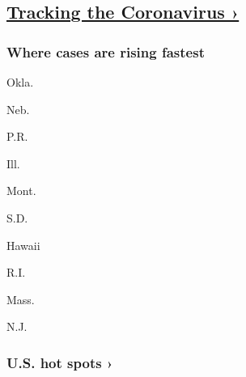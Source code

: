 \hypertarget{tracking-the-coronavirus-}{%
\subsection{\texorpdfstring{\href{https://www.nytimes3xbfgragh.onion/interactive/2020/us/coronavirus-us-cases.html}{Tracking
the Coronavirus
›}}{Tracking the Coronavirus ›}}\label{tracking-the-coronavirus-}}

\href{https://www.nytimes3xbfgragh.onion/interactive/2020/us/coronavirus-us-cases.html}{}

\hypertarget{where-cases-are-rising-fastest}{%
\subsubsection{\texorpdfstring{Where cases are \textbf{rising}
fastest}{Where cases are rising fastest}}\label{where-cases-are-rising-fastest}}

\href{https://www.nytimes3xbfgragh.onion/interactive/2020/us/oklahoma-coronavirus-cases.html}{}

Okla.
\href{https://www.nytimes3xbfgragh.onion/interactive/2020/us/nebraska-coronavirus-cases.html}{}

Neb.
\href{https://www.nytimes3xbfgragh.onion/interactive/2020/us/puerto-rico-coronavirus-cases.html}{}

P.R.
\href{https://www.nytimes3xbfgragh.onion/interactive/2020/us/illinois-coronavirus-cases.html}{}

Ill.
\href{https://www.nytimes3xbfgragh.onion/interactive/2020/us/montana-coronavirus-cases.html}{}

Mont.
\href{https://www.nytimes3xbfgragh.onion/interactive/2020/us/south-dakota-coronavirus-cases.html}{}

S.D.
\href{https://www.nytimes3xbfgragh.onion/interactive/2020/us/hawaii-coronavirus-cases.html}{}

Hawaii
\href{https://www.nytimes3xbfgragh.onion/interactive/2020/us/rhode-island-coronavirus-cases.html}{}

R.I.
\href{https://www.nytimes3xbfgragh.onion/interactive/2020/us/massachusetts-coronavirus-cases.html}{}

Mass.
\href{https://www.nytimes3xbfgragh.onion/interactive/2020/us/new-jersey-coronavirus-cases.html}{}

N.J.

\href{https://www.nytimes3xbfgragh.onion/interactive/2020/us/coronavirus-us-cases.html}{}

\hypertarget{us-hot-spots-}{%
\subsubsection{U.S. hot spots ›}\label{us-hot-spots-}}

